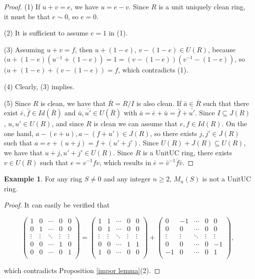 \documentclass[12pt]{amsart}
\theoremstyle{definition}
\newtheorem{example}[theorem]{Example}
\begin{document}
\begin{proof}
(1)  If $u+v=e$, we have $u=e-v$. Since $R$ is a unit uniquely clean ring, it must be that $e\sim 0$, so $e=0$.

(2) It is sufficient to assume $e=1$ in (1).

(3) Assuming $u+v=f$, then $u+(1-e)$, $v-(1-e) \in U(R)$, because $(u+(1-e)(u^{-1}+(1-e))= 1 = (v-(1-e))(v^{-1}-(1-e))$, so $(u+(1-e) + (v-(1-e)) = f$, which contradicts (1).

(4) Clearly, (3) implies.

(5) Since $R$ is clean, we have that $\overline{R}=R/I$ is also clean. If $\bar{a} \in \overline{R}$ such that there exist $\bar{e},\bar{f} \in Id(\overline{R})$ and $\bar{u},\bar{u'} \in U(\overline{R})$ with $\bar{a}=\bar{e}+\bar{u}=\bar{f}+\bar{u'}$. Since $I \subseteq J(R)$,  $u,u' \in U(R)$, and since $R$ is clean we can assume that $e,f \in Id(R)$. On the one hand, $a-(e+u), a-(f+u') \in J(R)$, so there exists $j,j' \in J(R)$ such that $a=e+(u+j)=f+(u'+j')$. Since $U(R)+J(R) \subseteq U(R)$, we have that $u+j , u'+j' \in U(R)$. Since $R$ is a   UnitUC ring, there exists $v \in U(R)$ such that $e=v^{-1}fv$, which results in $\bar{e}=\bar{v}^{-1}\bar{f}\bar{v}$.
\end{proof}

\begin{example} \label{matrix}
For any ring $S\neq 0$ and any integer $n \ge 2$, $M_n(S)$ is not a   UnitUC ring.
\end{example}
\begin{proof}
It can easily be verified that 

$$\begin{pmatrix}
1 & 0 & \cdots & 0 & 0\\
0 & 1 & \cdots & 0 & 0\\
\vdots & \vdots & \ddots & \vdots & \vdots\\
0 & 0 & \cdots & 1 & 0\\
0 & 0 & \cdots & 0 & 1\\
\end{pmatrix}=
\begin{pmatrix}
1 & 1 & \cdots & 0 & 0\\
0 & 1 & \cdots & 0 & 0\\
\vdots & \vdots & \ddots & \vdots & \vdots\\
0 & 0 & \cdots & 1 & 1\\
1 & 0 & \cdots & 0 & 0\\
\end{pmatrix} +
\begin{pmatrix}
0 & -1 & \cdots & 0 & 0\\
0 & 0 & \cdots & 0 & 0\\
\vdots & \vdots & \ddots & \vdots & \vdots\\
0 & 0 & \cdots & 0 & -1\\
-1 & 0 & \cdots & 0 & 1\\
\end{pmatrix},$$

which contradicts Proposition \ref{impor lemma}(2).
\end{proof}
\end{document}

